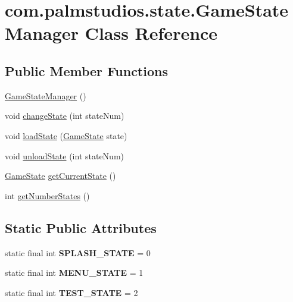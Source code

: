 \hypertarget{classcom_1_1palmstudios_1_1state_1_1_game_state_manager}{}\section{com.\+palmstudios.\+state.\+Game\+State\+Manager Class Reference}
\label{classcom_1_1palmstudios_1_1state_1_1_game_state_manager}
\subsection*{Public Member Functions}
\begin{DoxyCompactItemize}
\item 
\hyperlink{classcom_1_1palmstudios_1_1state_1_1_game_state_manager_ab02dba4a888b16cf4f47c997576f041d}{Game\+State\+Manager} ()
\item 
void \hyperlink{classcom_1_1palmstudios_1_1state_1_1_game_state_manager_a8fab9fad5746671be6e67b070df18795}{change\+State} (int state\+Num)
\item 
void \hyperlink{classcom_1_1palmstudios_1_1state_1_1_game_state_manager_a75b4fe76878a5d5c718db5b4fd67e297}{load\+State} (\hyperlink{classcom_1_1palmstudios_1_1system_1_1_game_state}{Game\+State} state)
\item 
void \hyperlink{classcom_1_1palmstudios_1_1state_1_1_game_state_manager_adf1d9cba6120bc0867300e032d72cc80}{unload\+State} (int state\+Num)
\item 
\hyperlink{classcom_1_1palmstudios_1_1system_1_1_game_state}{Game\+State} \hyperlink{classcom_1_1palmstudios_1_1state_1_1_game_state_manager_a2840d70af080363f64b11487d32502e8}{get\+Current\+State} ()
\item 
int \hyperlink{classcom_1_1palmstudios_1_1state_1_1_game_state_manager_a6782651569f9689ca1117dc3972abb7b}{get\+Number\+States} ()
\end{DoxyCompactItemize}
\subsection*{Static Public Attributes}
\begin{DoxyCompactItemize}
\item 
\mbox{\label{classcom_1_1palmstudios_1_1state_1_1_game_state_manager_aad9bda16ec225d69880fc323dbb90a1b}} 
static final int {\bfseries S\+P\+L\+A\+S\+H\+\_\+\+S\+T\+A\+TE} = 0
\item 
\mbox{\label{classcom_1_1palmstudios_1_1state_1_1_game_state_manager_a40b77d03ba35881b39ebf47860b24b32}} 
static final int {\bfseries M\+E\+N\+U\+\_\+\+S\+T\+A\+TE} = 1
\item 
\mbox{\label{classcom_1_1palmstudios_1_1state_1_1_game_state_manager_a0e0c60d79559ebdc97c409bd4e5e94bf}} 
static final int {\bfseries T\+E\+S\+T\+\_\+\+S\+T\+A\+TE} = 2
\end{DoxyCompactItemize}


